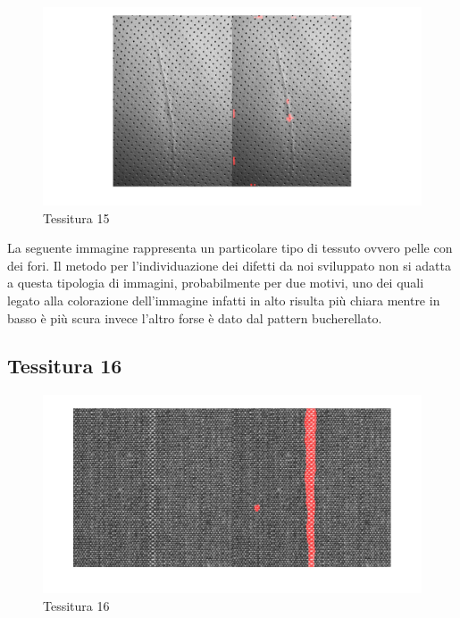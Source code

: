 \documentclass{article}
\begin{document}
\begin{figure}[h!]
	\centering
	\includegraphics[width=\textwidth]{results/res15.jpg}
	\caption{Tessitura 15}
	
\end{figure}

La seguente immagine rappresenta un particolare tipo di tessuto ovvero pelle con dei fori. Il metodo per l'individuazione dei difetti da noi sviluppato non si adatta a questa tipologia di immagini, probabilmente per due motivi, uno dei quali legato alla colorazione dell'immagine infatti in alto risulta più chiara mentre in basso è più scura invece l'altro forse è dato dal pattern bucherellato.

\newpage

\subsection{Tessitura 16}

\begin{figure}[h!]
	\centering
	\includegraphics[width=\textwidth]{results/res16.jpg}
	\caption{Tessitura 16}
\end{figure}

\newpage
\end{document}
